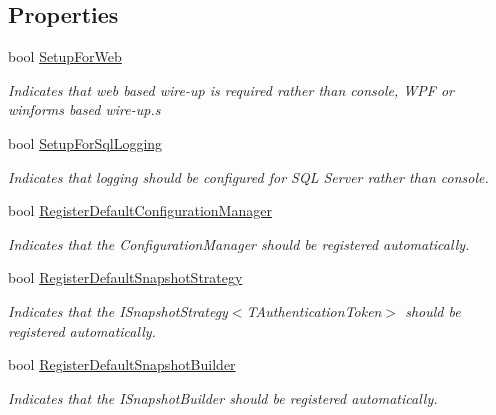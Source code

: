 \subsection*{Properties}
\begin{DoxyCompactItemize}
\item 
bool \hyperlink{classCqrs_1_1Ninject_1_1Configuration_1_1CqrsModule_ae4bbc2d44f283644a328d308dc78edc5_ae4bbc2d44f283644a328d308dc78edc5}{Setup\+For\+Web}
\begin{DoxyCompactList}\small\item\em Indicates that web based wire-\/up is required rather than console, W\+PF or winforms based wire-\/up.\+s \end{DoxyCompactList}\item 
bool \hyperlink{classCqrs_1_1Ninject_1_1Configuration_1_1CqrsModule_a10e7a8adbe03fc05ebb7003727cbe541_a10e7a8adbe03fc05ebb7003727cbe541}{Setup\+For\+Sql\+Logging}
\begin{DoxyCompactList}\small\item\em Indicates that logging should be configured for S\+QL Server rather than console. \end{DoxyCompactList}\item 
bool \hyperlink{classCqrs_1_1Ninject_1_1Configuration_1_1CqrsModule_a7e5a1cbb5bcfda3bcc06dc24a38995e2_a7e5a1cbb5bcfda3bcc06dc24a38995e2}{Register\+Default\+Configuration\+Manager}
\begin{DoxyCompactList}\small\item\em Indicates that the Configuration\+Manager should be registered automatically. \end{DoxyCompactList}\item 
bool \hyperlink{classCqrs_1_1Ninject_1_1Configuration_1_1CqrsModule_a79516f565ce235cc42c3c31e281824b8_a79516f565ce235cc42c3c31e281824b8}{Register\+Default\+Snapshot\+Strategy}
\begin{DoxyCompactList}\small\item\em Indicates that the I\+Snapshot\+Strategy$<$\+T\+Authentication\+Token$>$ should be registered automatically. \end{DoxyCompactList}\item 
bool \hyperlink{classCqrs_1_1Ninject_1_1Configuration_1_1CqrsModule_a151dd739535287d044791644b6111324_a151dd739535287d044791644b6111324}{Register\+Default\+Snapshot\+Builder}
\begin{DoxyCompactList}\small\item\em Indicates that the I\+Snapshot\+Builder should be registered automatically. \end{DoxyCompactList}\end{DoxyCompactItemize}
